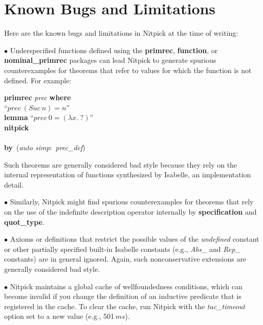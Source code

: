 \documentclass[a4paper,12pt]{article}
\def\unk{{?}}
\def\undef{(\lambda x.\; \unk)}
\begin{document}
\section{Known Bugs and Limitations}
\label{known-bugs-and-limitations}

Here are the known bugs and limitations in Nitpick at the time of writing:

\begin{enum}
\item[$\bullet$] Underspecified functions defined using the \textbf{primrec},
\textbf{function}, or \textbf{nominal\_\allowbreak primrec} packages can lead
Nitpick to generate spurious counterexamples for theorems that refer to values
for which the function is not defined. For example:

\prew
\textbf{primrec} \textit{prec} \textbf{where} \\
``$\textit{prec}~(\textit{Suc}~n) = n$'' \\[2\smallskipamount]
\textbf{lemma} ``$\textit{prec}~0 = \undef$'' \\
\textbf{nitpick} \\[2\smallskipamount]
 \nopagebreak\\[2\smallskipamount]
\textbf{by}~(\textit{auto simp}:~\textit{prec\_def})
\postw

Such theorems are generally considered bad style because they rely on the
internal representation of functions synthesized by Isabelle, an implementation
detail.

\item[$\bullet$] Similarly, Nitpick might find spurious counterexamples for
theorems that rely on the use of the indefinite description operator internally
by \textbf{specification} and \textbf{quot\_type}.

\item[$\bullet$] Axioms or definitions that restrict the possible values of the
\textit{undefined} constant or other partially specified built-in Isabelle
constants (e.g., \textit{Abs\_} and \textit{Rep\_} constants) are in general
ignored. Again, such nonconservative extensions are generally considered bad
style.

\item[$\bullet$] Nitpick maintains a global cache of wellfoundedness conditions,
which can become invalid if you change the definition of an inductive predicate
that is registered in the cache. To clear the cache,
run Nitpick with the \textit{tac\_timeout} option set to a new value (e.g.,
501$\,\textit{ms}$).


\end{enum}
\end{document}
